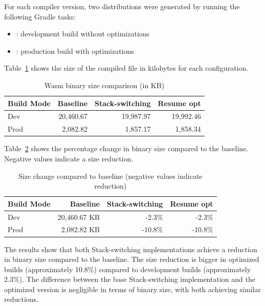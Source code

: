For each compiler version, two distributions were generated by running the following Gradle tasks:
\begin{itemize}
    \item {}: development build without optimizations
    \item {}: production build with optimizations
\end{itemize}

Table~\ref{tab:size-benchmark} shows the size of the compiled  file in kilobytes
for each configuration.

\begin{table}[H]
\centering
\caption{Wasm binary size comparison (in KB)}
\label{tab:size-benchmark}
\begin{tabular}{|l|r|r|r|}
\hline
\textbf{Build Mode} & \textbf{Baseline} & \textbf{Stack-switching} & \textbf{Resume opt} \\
\hline
Dev & 20,460.67 & 19,987.97 & 19,992.46 \\
Prod & 2,082.82 & 1,857.17 & 1,858.34 \\
\hline
\end{tabular}
\end{table}

Table~\ref{tab:size-percentage} shows the percentage change in binary size compared to the baseline. Negative values indicate a size reduction.

\begin{table}[H]
\centering
\caption{Size change compared to baseline (negative values indicate reduction)}
\label{tab:size-percentage}
\begin{tabular}{|l|r|r|r|}
\hline
\textbf{Build Mode} & \textbf{Baseline} & \textbf{Stack-switching} & \textbf{Resume opt} \\
\hline
Dev & 20,460.67 KB & -2.3\% & -2.3\% \\
Prod & 2,082.82 KB & -10.8\% & -10.8\% \\
\hline
\end{tabular}
\end{table}

The results show that both Stack-switching implementations achieve a reduction in binary size compared to the
baseline. The size reduction is bigger in optimized builds (approximately 10.8\%) compared to development builds
(approximately 2.3\%). The difference between the base Stack-switching implementation and the optimized version is
negligible in terms of binary size, with both achieving similar reductions.

